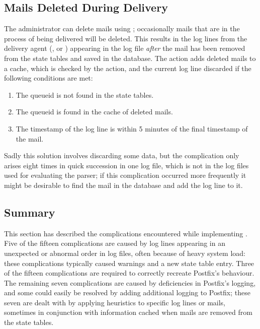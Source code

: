 \subsection{Mails Deleted During Delivery}

\label{Mails deleted during delivery}

The administrator can delete mails using ; occasionally
mails that are in the process of being delivered will be deleted.  This
results in the log lines from the delivery agent (,
 or ) appearing in the log file
\textit{after\/} the mail has been removed from the state tables and saved
in the database.  The  action adds deleted mails to a cache,
which is checked by the  action, and the current log
line discarded if the following conditions are met:

\begin{enumerate}

    \item The queueid is not found in the state tables.

    \item The queueid is found in the cache of deleted mails.

    \item The timestamp of the log line is within 5 minutes of the final
        timestamp of the mail.

\end{enumerate}

Sadly this solution involves discarding some data, but the complication
only arises eight times in quick succession in one log file, which is not
in the \numberOFlogFILES{} log files used for evaluating the parser; if
this complication occurred more frequently it might be desirable to find
the mail in the database and add the log line to it.

\subsection{Summary}

This section has described the complications encountered while implementing
\parsername{}.  Five of the fifteen complications are caused by log lines
appearing in an unexpected or abnormal order in log files, often because of
heavy system load: these complications typically caused warnings and a new
state table entry.  Three of the fifteen complications are required to
correctly recreate Postfix's behaviour.  The remaining seven complications
are caused by deficiencies in Postfix's logging, and some could easily be
resolved by adding additional logging to Postfix; these seven are dealt
with by applying heuristics to specific log lines or mails, sometimes in
conjunction with information cached when mails are removed from the state
tables.
